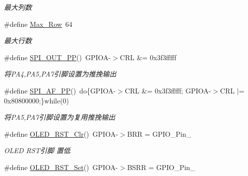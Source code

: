 \begin{DoxyCompactItemize}
\begin{DoxyCompactList}\small\item\em 最大列数 \end{DoxyCompactList}\item 
\hypertarget{group___o_l_e_d_ga602fd8e5bfed41e97894b16baae07edd}{\#define \hyperlink{group___o_l_e_d_ga602fd8e5bfed41e97894b16baae07edd}{\-Max\-\_\-\-Row}~64}\label{group___o_l_e_d_ga602fd8e5bfed41e97894b16baae07edd}

\begin{DoxyCompactList}\small\item\em 最大行数 \end{DoxyCompactList}\item 
\hypertarget{group___o_l_e_d_ga8bde539cd7c96dcc9b52ea891b67dc51}{\#define \hyperlink{group___o_l_e_d_ga8bde539cd7c96dcc9b52ea891b67dc51}{\-S\-P\-I\-\_\-\-O\-U\-T\-\_\-\-P\-P}()~\-G\-P\-I\-O\-A-\/$>$\-C\-R\-L \&= 0x3f3fffff}\label{group___o_l_e_d_ga8bde539cd7c96dcc9b52ea891b67dc51}

\begin{DoxyCompactList}\small\item\em 将\-P\-A4,\-P\-A5,\-P\-A7引脚设置为推挽输出 \end{DoxyCompactList}\item 
\hypertarget{group___o_l_e_d_ga1c397043e8f38e336e5fcb60408b6a18}{\#define \hyperlink{group___o_l_e_d_ga1c397043e8f38e336e5fcb60408b6a18}{\-S\-P\-I\-\_\-\-A\-F\-\_\-\-P\-P}()~do\{\-G\-P\-I\-O\-A-\/$>$\-C\-R\-L \&= 0x3f3fffff; G\-P\-I\-O\-A-\/$>$\-C\-R\-L $|$= 0x80800000;\}while(0)}\label{group___o_l_e_d_ga1c397043e8f38e336e5fcb60408b6a18}

\begin{DoxyCompactList}\small\item\em 将\-P\-A5,\-P\-A7引脚设置为复用推挽输出 \end{DoxyCompactList}\item 
\hypertarget{group___o_l_e_d_gae9d49d65844eaecae8ae13538f5a796e}{\#define \hyperlink{group___o_l_e_d_gae9d49d65844eaecae8ae13538f5a796e}{\-O\-L\-E\-D\-\_\-\-R\-S\-T\-\_\-\-Clr}()~\-G\-P\-I\-O\-A-\/$>$\-B\-R\-R = \-G\-P\-I\-O\-\_\-\-Pin\-\_}\label{group___o_l_e_d_gae9d49d65844eaecae8ae13538f5a796e}

\begin{DoxyCompactList}\small\item\em \-O\-L\-E\-D \-R\-S\-T引脚 置低 \end{DoxyCompactList}\item 
\hypertarget{group___o_l_e_d_ga00c8a25cd2eeedae315ee26287f4adda}{\#define \hyperlink{group___o_l_e_d_ga00c8a25cd2eeedae315ee26287f4adda}{\-O\-L\-E\-D\-\_\-\-R\-S\-T\-\_\-\-Set}()~\-G\-P\-I\-O\-A-\/$>$\-B\-S\-R\-R = \-G\-P\-I\-O\-\_\-\-Pin\-\_}\label{group___o_l_e_d_ga00c8a25cd2eeedae315ee26287f4adda}


\end{DoxyCompactItemize}
